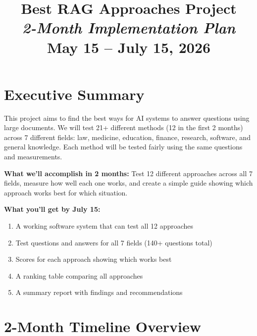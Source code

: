 \documentclass[11pt,a4paper]{article}
\title{\vspace{-0.5in}\textbf{{\Large Best RAG Approaches Project}}\\\textit{2-Month Implementation Plan}\\{\normalsize May 15 -- July 15, 2026}\vspace{-0.3in}}
\author{}
\date{}
\begin{document}
\maketitle

\section*{Executive Summary}

This project aims to find the best ways for AI systems to answer questions using large documents. We will test 21+ different methods (12 in the first 2 months) across 7 different fields: law, medicine, education, finance, research, software, and general knowledge. Each method will be tested fairly using the same questions and measurements.

\vspace{0.2cm}
\noindent
\textbf{What we'll accomplish in 2 months:} Test 12 different approaches across all 7 fields, measure how well each one works, and create a simple guide showing which approach works best for which situation.

\vspace{0.2cm}
\noindent
\textbf{What you'll get by July 15:}
\begin{enumerate}\setlength{\itemsep}{0pt}
    \item A working software system that can test all 12 approaches
    \item Test questions and answers for all 7 fields (140+ questions total)
    \item Scores for each approach showing which works best
    \item A ranking table comparing all approaches
    \item A summary report with findings and recommendations
\end{enumerate}

\section*{2-Month Timeline Overview}
\end{document}
